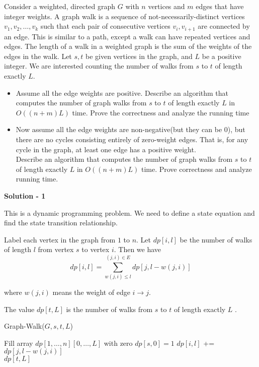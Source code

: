 \documentclass{article}
\newcounter{exercise}
\newcommand{\<}{
    \langle}
\renewcommand{\>}{
    \rangle}
\begin{document}
{\begin{exercise}
Consider a weighted, directed graph $G$ with $n$ vertices and $m$ edges that have integer weights. A graph walk is a sequence of
not-necessarily-distinct vertices $v_1,v_2,\ldots,v_k$ such that each pair of consecutive vertices $v_i,v_{i+1}$ are connected by an edge. This is similar to a path, except a walk can have repeated vertices and edges. The length of a walk in a weighted graph is the sum of the weights of the edges in the walk. Let $s,t$ be given vertices in the graph, and $L$ be a positive integer. We are interested counting the number of walks from $s$ to $t$ of length exactly $L$.
\begin{itemize}
\item Assume all the edge weights are positive. Describe an algorithm that computes the number of graph walks from $s$ to $t$ of length exactly $L$ in $O((n+m)L)$ time. Prove the correctness and analyze the running time
\item Now assume all the edge weights are non-negative(but they can be 0), but there are no cycles consisting entirely of zero-weight edges. That is, for any cycle in the graph, at least one edge has a positive weight.\\
Describe an algorithm that computes the number of graph walks from $s$ to $t$ of length exactly $L$ in $O((n+m)L)$ time. Prove correctness and analyze running time.
\end{itemize}
\end{exercise}

\newpage
\noindent \textbf{Solution - 1}

This is a dynamic programming problem. We need to define a state equation and find the state transition relationship.

Label each vertex in the graph from $1$ to $n$. Let $dp[i, l]$ be the number of walks of length $l$ from vertex $s$ to vertex $i$. Then we have
$$
dp[i, l] = \sum_{w(j, i) \le l}^{(j, i) \in E} dp[j, l-w(j, i)]
$$
 
where $w(j, i)$ means the weight of edge $i \rightarrow j$.
 
The value $dp[t, L]$ is the number of walks from $s$ to $t$ of length exactly $L$ .

\begin{algorithm}[htb]
\caption{Graph-Walk($G, s, t, L$)}
\begin{algorithmic}[1]
\State Fill array $dp[1, \dots, n][0, \dots, L]$ with zero
\State $dp[s, 0] = 1$
        \State $dp[i, l]$ += $dp[j, l-w(j, i)]$
        \EndFor
    \EndFor
\EndFor \\
\Return $dp[t, L]$
\end{algorithmic}
\end{algorithm}

}
\end{document}
